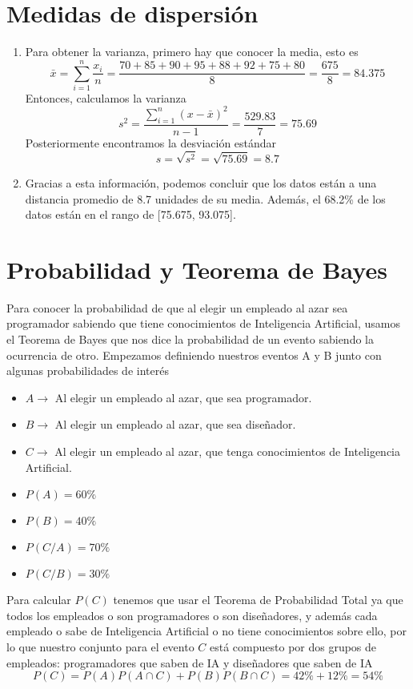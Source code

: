 \documentclass[12pt, letterpaper]{article}
\begin{document}
\section{Medidas de dispersión}
\begin{enumerate}
    \item Para obtener la varianza, primero hay que conocer la media, esto es
    \begin{equation*}
        \bar{x} = \sum_{i = 1}^{n} \frac{x_{i}}{n} = \frac{70+85+90+95+88+92+75+80}{8} = \frac{675}{8} = 84.375
    \end{equation*}
    Entonces, calculamos la varianza
    \begin{equation*}
        s^{2} = \frac{\sum_{i = 1}^{n} (x-\bar{x})^{2}}{n-1} = \frac{529.83}{7} = 75.69
    \end{equation*}
    Posteriormente encontramos la desviación estándar
    \begin{equation*}
        s = \sqrt{s^{2}} = \sqrt{75.69} = 8.7
    \end{equation*}
    \item Gracias a esta información, podemos concluir que los datos están a una distancia promedio de 8.7 unidades de su media. Además, el 68.2\% de los datos están en el rango de [75.675, 93.075].
\end{enumerate}

\section{Probabilidad y Teorema de Bayes}
Para conocer la probabilidad de que al elegir un empleado al azar sea programador sabiendo que tiene conocimientos de Inteligencia Artificial, usamos el Teorema de Bayes que nos dice la probabilidad de un evento sabiendo la ocurrencia de otro. Empezamos definiendo nuestros eventos A y B junto con algunas probabilidades de interés
\begin{itemize}
    \item $ A \rightarrow $ Al elegir un empleado al azar, que sea programador.
    \item $ B \rightarrow $ Al elegir un empleado al azar, que sea diseñador.
    \item $ C \rightarrow $ Al elegir un empleado al azar, que tenga conocimientos de Inteligencia Artificial.
    \item $ P(A) = 60\% $
    \item $ P(B) = 40\% $
    \item $ P(C/A) = 70\% $
    \item $ P(C/B) = 30\% $
\end{itemize}
Para calcular $ P(C) $ tenemos que usar el Teorema de Probabilidad Total ya que todos los empleados o son programadores o son diseñadores, y además cada empleado o sabe de Inteligencia Artificial o no tiene conocimientos sobre ello, por lo que nuestro conjunto para el evento $ C $ está compuesto por dos grupos de empleados: programadores que saben de IA y diseñadores que saben de IA
\begin{equation*}
    P(C) = P(A)P(A \cap C) + P(B)P(B \cap C) = 42\% + 12\% = 54\%
\end{equation*}
\end{document}
